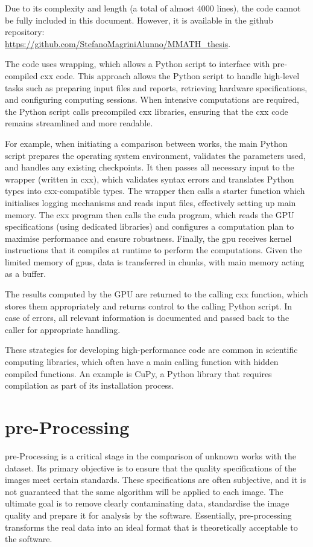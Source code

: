 \begin{toReview}
	\noindent Due to its complexity and length (a total of almost $4000$ lines), the code cannot be fully included in this document. However, it is available in the \gls{github} repository:\\ \url{https://github.com/StefanoMagriniAlunno/MMATH_thesis}.

	\bigskip\noindent The code uses wrapping, which allows a \gls{Python} script to interface with pre-compiled \gls{cxx} code. This approach allows the \gls{Python} script to handle high-level tasks such as preparing input files and reports, retrieving hardware specifications, and configuring computing sessions. When intensive computations are required, the \gls{Python} script calls precompiled \gls{cxx} libraries, ensuring that the \gls{cxx} code remains streamlined and more readable.

	\noindent For example, when initiating a comparison between works, the main \gls{Python} script prepares the operating system environment, validates the parameters used, and handles any existing checkpoints. It then passes all necessary input to the wrapper (written in \gls{cxx}), which validates syntax errors and translates Python types into \gls{cxx}-compatible types. The wrapper then calls a starter function which initialises logging mechanisms and reads input files, effectively setting up main memory. The \gls{cxx} program then calls the \gls{cuda} program, which reads the GPU specifications (using dedicated libraries) and configures a computation plan to maximise performance and ensure robustness. Finally, the \gls{gpu} receives kernel instructions that it compiles at runtime to perform the computations. Given the limited memory of \gls{gpu}s, data is transferred in chunks, with main memory acting as a buffer.

	\noindent The results computed by the GPU are returned to the calling \gls{cxx} function, which stores them appropriately and returns control to the calling \gls{Python} script. In case of errors, all relevant information is documented and passed back to the caller for appropriate handling.

	\noindent These strategies for developing high-performance code are common in scientific computing libraries, which often have a main calling function with hidden compiled functions. An example is CuPy, a \gls{Python} library that requires compilation as part of its installation process.

	\section{pre-Processing}
	pre-Processing is a critical stage in the comparison of unknown works with the dataset. Its primary objective is to ensure that the quality specifications of the images meet certain standards. These specifications are often subjective, and it is not guaranteed that the same algorithm will be applied to each image. The ultimate goal is to remove clearly contaminating data, standardise the image quality and prepare it for analysis by the software. Essentially, pre-processing transforms the real data into an ideal format that is theoretically acceptable to the software.


\end{toReview}
